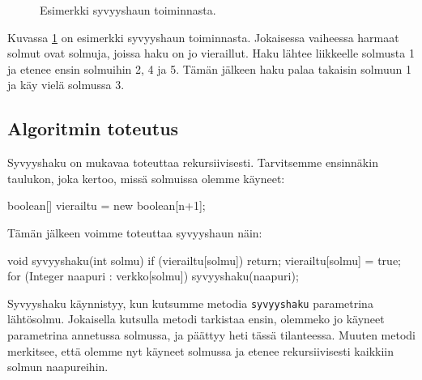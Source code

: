 \begin{figure}
\begin{center}
\end{center}
\caption{Esimerkki syvyyshaun toiminnasta.}
\label{fig:syvhak}
\end{figure}

Kuvassa \ref{fig:syvhak} on esimerkki syvyyshaun toiminnasta.
Jokaisessa vaiheessa harmaat solmut ovat solmuja,
joissa haku on jo vieraillut.
Haku lähtee liikkeelle solmusta 1 ja etenee ensin
solmuihin 2, 4 ja 5.
Tämän jälkeen haku palaa takaisin solmuun 1
ja käy vielä solmussa 3.

\subsection{Algoritmin toteutus}

Syvyyshaku on mukavaa toteuttaa rekursiivisesti.
Tarvitsemme ensinnäkin taulukon, joka kertoo,
missä solmuissa olemme käyneet:

\begin{code}
boolean[] vierailtu = new boolean[n+1];
\end{code}

Tämän jälkeen voimme toteuttaa syvyyshaun näin:

\begin{code}
void syvyyshaku(int solmu) {
    if (vierailtu[solmu]) return;
    vierailtu[solmu] = true;
    for (Integer naapuri : verkko[solmu]) {
        syvyyshaku(naapuri);
    }
}
\end{code}

Syvyyshaku käynnistyy, kun kutsumme metodia
\texttt{syvyyshaku} parametrina lähtösolmu.
Jokaisella kutsulla metodi tarkistaa ensin,
olemmeko jo käyneet parametrina annetussa solmussa,
ja päättyy heti tässä tilanteessa.
Muuten metodi merkitsee, että olemme nyt käyneet solmussa
ja etenee rekursiivisesti kaikkiin solmun naapureihin.

